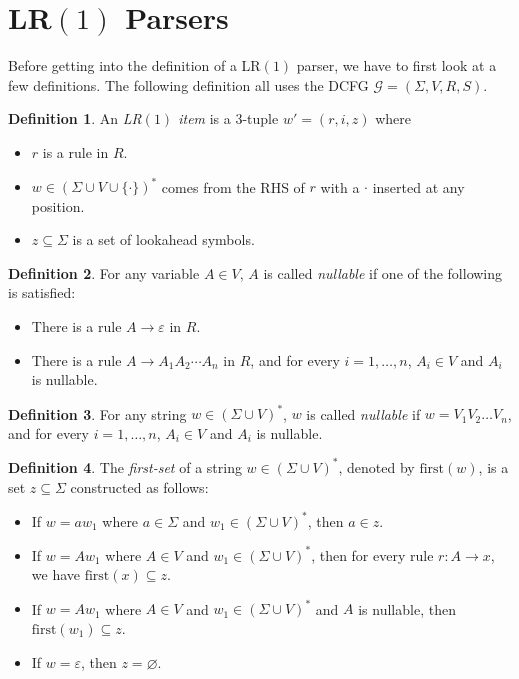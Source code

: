 \documentclass[titlepage]{article}
\theoremstyle{plain}
\theoremstyle{definition}
\newtheorem*{definition}{Definition}
\theoremstyle{remark}
\begin{document}
\section{LR$(1)$ Parsers}
Before getting into the definition of a LR$(1)$ parser, we have to first look
at a few definitions. The following definition all uses the DCFG $\mathcal{G}
=(\Sigma,V,R,S)$.
\begin{definition}
  An \textit{LR$(1)$ item} is a 3-tuple $w'=(r,i,z)$ where
  \begin{itemize}
    \item $r$ is a rule in $R$.
    \item $w\in{(\Sigma\cup V\cup\{\cdot\})}^*$ comes from the RHS of $r$
      with a $\cdot$ inserted at any position.
    \item $z\subseteq\Sigma$ is a set of lookahead symbols.
  \end{itemize}
\end{definition}
\begin{definition}
  For any variable $A\in V$, $A$ is called \textit{nullable} if one of the
  following is satisfied:
  \begin{itemize}
    \item There is a rule $A\rightarrow\varepsilon$ in $R$.
    \item There is a rule $A\rightarrow A_1A_2\cdots A_n$ in $R$, and for every
      $i=1,\ldots,n$, $A_i\in V$ and $A_i$ is nullable.
  \end{itemize}
\end{definition}
\begin{definition}
	For any string $w\in(\Sigma\cup V)^*$, $w$ is called \textit{nullable} if
	$w=V_1V_2\ldots V_n$, and for every $i=1,\ldots,n$, $A_i\in V$ and $A_i$ is 
	nullable.
\end{definition}
\begin{definition}
  The \textit{first-set} of a string $w\in{(\Sigma\cup V)}^*$, denoted by
  $\text{first}(w)$, is a set $z\subseteq\Sigma$ constructed as follows:
  \begin{itemize}
    \item If $w=aw_1$ where $a\in\Sigma$ and $w_1\in{(\Sigma\cup V)}^*$, then
      $a\in z$.
    \item If $w=Aw_1$ where $A\in V$ and $w_1\in{(\Sigma\cup V)}^*$, then
      for every rule $r: A\rightarrow x$, we have $\text{first}(x)\subseteq
      z$.
    \item If $w=Aw_1$ where $A\in V$ and $w_1\in{(\Sigma\cup V)}^*$ and $A$
        is nullable, then $\text{first}(w_1)\subseteq z$.
    \item If $w=\varepsilon$, then $z=\varnothing$.
  \end{itemize}
\end{definition}
\end{document}
